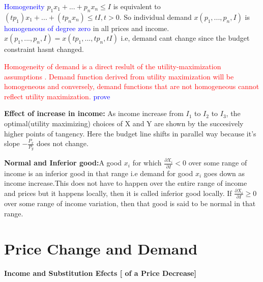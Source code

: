 \documentclass{tufte-handout}
\begin{document}
\textbullet  \textcolor{blue}{Homogeneity}  $p_1x_1 + ... + p_nx_n \le I$ is equivalent to $(tp_1)x_1 + ... +(tp_nx_n) \le tI, t>0$. So individual demand $x(p_1,..., p_n, I)$ is \textcolor{blue}{homogeneous of degree zero} in all prices and income.\\
$x(p_1, ...,p_n, I) = x(tp_1, ..., tp_n, tI)$ i.e, demand cant change since the budget constraint hasnt changed.


\textcolor{red}{Homogeneity of demand is a direct reslult of the utility-maximization assumptions . Demand function derived from utility maximization will be homogeneous and conversely, demand functions that are not homogeneous cannot reflect utility maximization.} \textcolor{blue}{prove}






\clearpage

\textbf{Effect of increase in income:} As income increase from $I_1$ to $I_2$ to $I_3$, the optimal(utility maximizing) choices of X and Y are shown by the succesively higher points of tangency. Here the budget line shifts in parallel way because it's slope $-\frac{P_x}{P_y}$ does not change.

\textbf{Normal and Inferior good:}A good $x_i$ for which  $\frac{\partial X_i}{\partial I} < 0$ over some range of income is an inferior good in that range i.e demand for good $x_i$ goes down as income increase.This does not have to happen over the entire range of income and prices but it happens locally, then it is called inferior good locally. If $\frac{\partial X_i}{\partial I} \ge 0$ over some range of income variation, then that good is said to be  normal in that range.


\vspace{2cm}

\section{\textbf{Price Change and Demand}}

\textbf{\centering  Income and Substitution Efects [ of a Price Decrease] }\\
\vspace{0.5cm}
\end{document}
